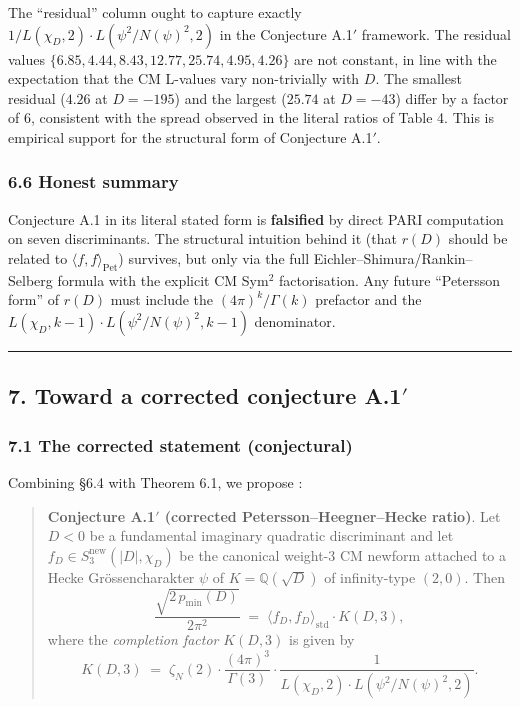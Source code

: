 \documentclass[
  11pt,
  a4paper,
]{amsart}
\begin{document}
The ``residual'' column ought to capture exactly \(1/L(\chi_D, 2)\cdot L(\psi^{2}/N(\psi)^{2}, 2)\) in the Conjecture A.1\('\) framework. The residual values \(\{6.85, 4.44, 8.43, 12.77, 25.74, 4.95, 4.26\}\) are not constant, in line with the expectation that the CM L-values vary non-trivially with \(D\). The smallest residual (\(4.26\) at \(D=-195\)) and the largest (\(25.74\) at \(D=-43\)) differ by a factor of 6, consistent with the spread observed in the literal ratios of Table 4. This is empirical support for the structural form of Conjecture A.1\('\).

\hypertarget{honest-summary}{%
\subsubsection{6.6 Honest summary}\label{honest-summary}}

Conjecture A.1 in its literal stated form is \textbf{falsified} by direct PARI computation on seven discriminants. The structural intuition behind it (that \(r(D)\) should be related to \(\langle f, f\rangle_{\mathrm{Pet}}\)) survives, but only via the full Eichler--Shimura/Rankin--Selberg formula with the explicit CM Sym\(^{2}\) factorisation. Any future ``Petersson form'' of \(r(D)\) must include the \((4\pi)^{k}/\Gamma(k)\) prefactor and the \(L(\chi_D, k-1)\cdot L(\psi^{2}/N(\psi)^{2}, k-1)\) denominator.

\begin{center}\rule{0.5\linewidth}{0.5pt}\end{center}

\hypertarget{toward-a-corrected-conjecture-a.1}{%
\subsection{\texorpdfstring{7. Toward a corrected conjecture A.1\('\)}{7. Toward a corrected conjecture A.1\textquotesingle{}}}\label{toward-a-corrected-conjecture-a.1}}

\hypertarget{the-corrected-statement-conjectural}{%
\subsubsection{7.1 The corrected statement (conjectural)}\label{the-corrected-statement-conjectural}}

Combining §6.4 with Theorem 6.1, we propose :

\begin{quote}
\textbf{Conjecture A.1\('\) (corrected Petersson--Heegner--Hecke ratio)}. Let \(D < 0\) be a fundamental imaginary quadratic discriminant and let \(f_D \in S_3^{\mathrm{new}}(|D|, \chi_D)\) be the canonical weight-3 CM newform attached to a Hecke Grössencharakter \(\psi\) of \(K = \mathbb{Q}(\sqrt D)\) of infinity-type \((2, 0)\). Then
\[
\frac{\sqrt{2\, p_{\min}(D)}}{2\pi^{2}} \;=\; \langle f_D, f_D\rangle_{\mathrm{std}}\cdot K(D, 3),
\]
where the \emph{completion factor} \(K(D, 3)\) is given by
\[
K(D, 3) \;=\; \zeta_N(2)\cdot \frac{(4\pi)^{3}}{\Gamma(3)}\cdot \frac{1}{L(\chi_D, 2)\cdot L(\psi^{2}/N(\psi)^{2}, 2)}.
\]
\end{quote}
\end{document}

